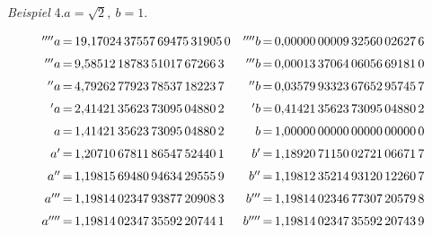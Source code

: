 \begin{center}\textit{Beispiel} 4.\quad $a=\surd 2,\ b=1$.\end{center}
\begingroup\small\setlength{\arraycolsep}{0pt}
\[\begin{array}{r@{\,=\,}l@{\quad}r@{\,=\,}l}
{}^{\prime\prime\prime\prime}a&19{,}17024\,37557\,69475\,31905\,0&{}^{\prime\prime\prime\prime}b&0{,}00000\,00009\,32560\,02627\,6\\[6pt]
{}^{\prime\prime\prime}a&9{,}58512\,18783\,51017\,67266\,3&{}^{\prime\prime\prime}b&0{,}00013\,37064\,06056\,69181\,0\\[6pt]
{}^{\prime\prime}a&4{,}79262\,77923\,78537\,18223\,7&{}^{\prime\prime}b&0{,}03579\,93323\,67652\,95745\,7\\[6pt]
{}^{\prime}a&2{,}41421\,35623\,73095\,04880\,2&{}^{\prime}b&0{,}41421\,35623\,73095\,04880\,2\\[6pt]
a&1{,}41421\,35623\,73095\,04880\,2&b&1{,}00000\,00000\,00000\,00000\,0\\[6pt]
a'&1{,}20710\,67811\,86547\,52440\,1&b'&1{,}18920\,71150\,02721\,06671\,7\\[6pt]
a''&1{,}19815\,69480\,94634\,29555\,9&b''&1{,}19812\,35214\,93120\,12260\,7\\[6pt]
a'''&1{,}19814\,02347\,93877\,20908\,3&b'''&1{,}19814\,02346\,77307\,20579\,8\\[6pt]
a''''&1{,}19814\,02347\,35592\,20744\,1&b''''&1{,}19814\,02347\,35592\,20743\,9
\end{array}
\]\endgroup


